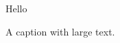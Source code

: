 \documentclass{article}
\begin{document}
\begin{figure}
Hello
\caption{A caption with large text.}
\end{figure}
\end{document}
